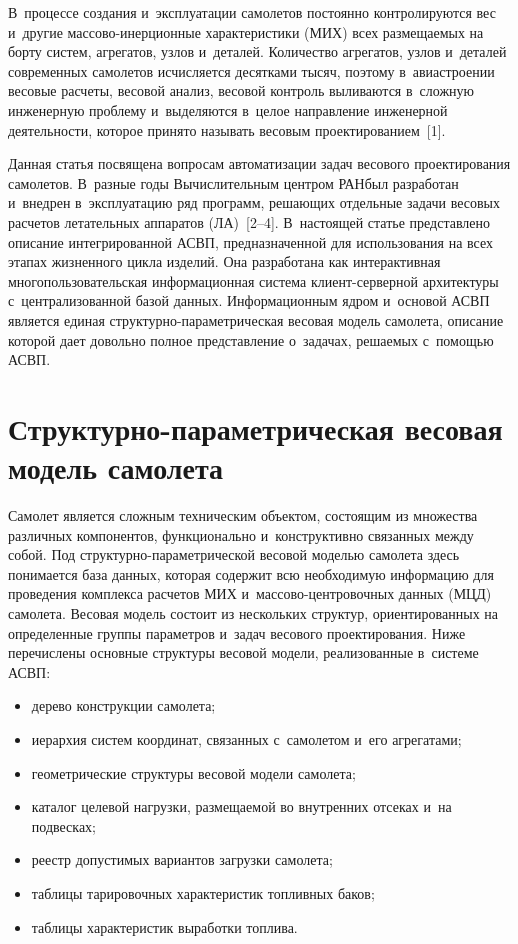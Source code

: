 \begin{multicols}{2}
В~процессе создания и~эксплуатации самолетов постоянно 
контролируются вес и~другие мас\-со\-во-инер\-ци\-он\-ные характеристики (МИХ)
всех размещаемых на борту систем, агрегатов, узлов и~деталей. Количество 
агрегатов, узлов и~деталей современных самолетов исчисляется 
десятками тысяч, поэтому в~авиастроении весовые расчеты, весовой анализ, 
весовой контроль выливаются в~сложную инженерную проблему и~выделяются 
в~целое направление инженерной деятельности, которое принято называть 
весовым проектированием~[1].
  
  Данная статья посвящена вопросам автоматизации задач весового 
проектирования самолетов. В~разные годы Вычислительным центром РАН\linebreak был 
разработан и~внедрен в~эксплуатацию ряд \mbox{программ}, решающих отдельные 
задачи весовых рас\-че\-тов летательных аппаратов (ЛА)~[2--4]. В~настоящей статье 
представлено описание интегрированной АСВП, предназначенной для использования на всех 
этапах жизненного цикла изделий. Она разработана как интерактивная 
многопользовательская информационная система кли\-ент-сер\-вер\-ной 
архитектуры с~централизованной базой данных. Информационным ядром 
и~основой АСВП является единая струк\-тур\-но-па\-ра\-мет\-ри\-че\-ская весовая модель 
самолета, описание которой дает довольно полное представление о~задачах, 
решаемых с~помощью АСВП.

\section{Структурно-параметрическая весовая модель самолета}

  Самолет является сложным техническим объ\-ектом, состоящим из множества 
различных \mbox{ком\-понентов}, функционально и~конструктивно связанных между 
собой. Под струк\-тур\-но-па\-ра\-мет\-ри\-че\-ской весовой моделью самолета 
здесь понимается база данных, которая содержит всю необходи\-мую 
информацию для проведения комплекса расчетов 
МИХ и~мас\-со\-во-цент\-ро\-воч\-ных данных (МЦД) 
самолета. Весовая модель состоит из нескольких структур, ориентированных на 
определенные группы параметров и~задач весового проектирования. Ниже 
перечислены основные структуры весовой модели, реализованные в~системе 
АСВП:
  \begin{itemize}
\item дерево конструкции самолета;
\item иерархия систем координат, связанных с~самолетом и~его агрегатами;
\item геометрические структуры весовой модели самолета;
\item каталог целевой нагрузки, размещаемой во внут\-рен\-них отсеках и~на 
подвесках;
\item реестр допустимых вариантов загрузки само\-лета;
\item таблицы тарировочных характеристик топливных баков;
\item таблицы характеристик выработки топлива.
\end{itemize}



\end{multicols}
